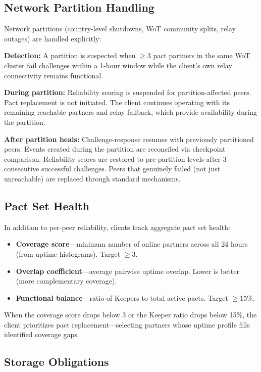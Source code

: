 \documentclass[11pt,a4paper]{article}
\begin{document}
\subsection{Network Partition Handling}

Network partitions (country-level shutdowns, WoT community splits, relay outages) are handled explicitly:

\textbf{Detection:} A partition is suspected when ${\geq}3$ pact partners in the same WoT cluster fail challenges within a 1-hour window while the client's own relay connectivity remains functional.

\textbf{During partition:} Reliability scoring is suspended for partition-affected peers. Pact replacement is not initiated. The client continues operating with its remaining reachable partners and relay fallback, which provide availability during the partition.

\textbf{After partition heals:} Challenge-response resumes with previously partitioned peers. Events created during the partition are reconciled via checkpoint comparison. Reliability scores are restored to pre-partition levels after 3 consecutive successful challenges. Peers that genuinely failed (not just unreachable) are replaced through standard mechanisms.

\subsection{Pact Set Health}

In addition to per-peer reliability, clients track aggregate pact set health:

\begin{itemize}
  \item \textbf{Coverage score}---minimum number of online partners across all 24 hours (from uptime histograms). Target $\geq 3$.
  \item \textbf{Overlap coefficient}---average pairwise uptime overlap. Lower is better (more complementary coverage).
  \item \textbf{Functional balance}---ratio of Keepers to total active pacts. Target $\geq 15\%$.
\end{itemize}

When the coverage score drops below 3 or the Keeper ratio drops below 15\%, the client prioritizes pact replacement---selecting partners whose uptime profile fills identified coverage gaps.

\subsection{Storage Obligations}
\end{document}
